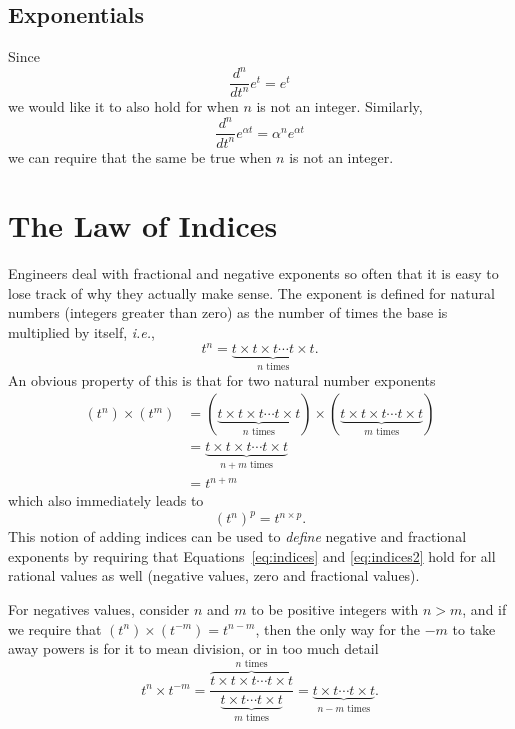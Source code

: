 \subsection{Exponentials}
Since
\begin{equation*}
  \frac{d^n}{dt^n}e^t = e^t
\end{equation*}
we would like it to also hold for when $n$ is not an integer.  Similarly, 
\begin{equation*}
  \frac{d^n}{dt^n} e^{\alpha t} = \alpha^n e^{\alpha t}
\end{equation*}
we can require that the same be true when $n$ is not an integer.

\section{The Law of Indices}

Engineers deal with fractional and negative exponents so often that it is easy to lose track of why they actually make sense. The exponent is defined for natural numbers (integers greater than zero) as the number of times the base is multiplied by itself, \textit{i.e.},
\begin{equation}
  t^n = \underbrace{t \times t \times t \cdots t \times t}_{\mbox{$n$ times}}.
  \label{eq:power}
\end{equation}
An obvious property of this is that for two natural number exponents
\begin{align}
  \left(t^n\right) \times \left( t^m \right) &=  \left( \underbrace{t \times t \times t \cdots t \times t}_{\mbox{$n$ times}}
  \right) \times \left( \underbrace{t \times t \times t \cdots t \times t}_{\mbox{$m$ times}}
  \right) \\
  &= 
  \underbrace{t \times t \times t \cdots t \times t}_{\mbox{$n + m$ times}} \\
  &= t^{n + m}
  \label{eq:indices}
\end{align}
which also immediately leads to
\begin{equation}
  \left( t^n \right)^p = t^{n \times p}.
  \label{eq:indices2}
\end{equation}
This notion of adding indices can be used to \emph{define} negative and fractional exponents by requiring that Equations~\ref{eq:indices} and \ref{eq:indices2} hold for all rational values as well (negative values, zero and fractional values). 

For negatives values, consider $n$ and $m$ to be positive integers with $n > m$, and if we require that $\left( t^n \right) \times \left( t^{-m} \right) = t^{n-m}$, then the only way for the $-m$ to take away powers is for it to mean division, or in too much detail
\begin{equation}
  t^n \times t^{-m} = \frac{\overbrace{t \times t \times t \cdots t \times t}^{\mbox{$n$ times}}}{\underbrace{t \times t \cdots t \times t}_{\mbox{$m$ times}}} = \underbrace{t \times t  \cdots t \times t}_{\mbox{$n-m$ times}}.
  \label{eq:indices3}
\end{equation}

